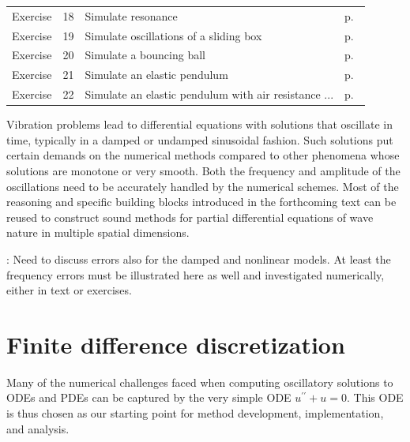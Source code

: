 \documentclass[%
oneside,                 %
final,                   %
10pt]{article}
\newcommand{\longinlinecomment}[3]{{\color{red}{\bf #1}: #2}}
\begin{document}
\begin{tabular}{lrll}
Exercise & 18 & Simulate resonance & p.~\pageref{vib:exer:resonance} \\
Exercise & 19 & Simulate oscillations of a sliding box & p.~\pageref{vib:exer:sliding_box} \\
Exercise & 20 & Simulate a bouncing ball & p.~\pageref{vib:exer:bouncing:ball} \\
Exercise & 21 & Simulate an elastic pendulum & p.~\pageref{vib:exer:pendulum_elastic} \\
Exercise & 22 & Simulate an elastic pendulum with air resistance ... & p.~\pageref{vib:exer:pendulum_elastic_drag} \\
\end{tabular}
\clearpage %




\vspace{1cm} %






Vibration problems lead to differential equations with solutions that
oscillate in time, typically in a damped or undamped sinusoidal
fashion.  Such solutions put certain demands on the numerical methods
compared to other phenomena whose solutions are monotone or very smooth.
Both the frequency and amplitude of the oscillations need to be
accurately handled by the numerical schemes. Most of the reasoning and
specific building blocks introduced in the forthcoming text can be
reused to construct sound methods for partial differential equations
of wave nature in multiple spatial dimensions.

\longinlinecomment{hpl 1}{ Need to discuss errors also for the damped and nonlinear models. At least the frequency errors must be illustrated here as well and investigated numerically, either in text or exercises. }{ Need to discuss errors }

\section{Finite difference discretization}
\label{vib:model1}

Many of the numerical challenges faced when computing oscillatory
solutions to ODEs and PDEs can be captured by the very simple ODE
$u^{\prime\prime} + u =0$. This ODE is thus chosen as our starting
point for method development, implementation, and analysis.
\end{document}
